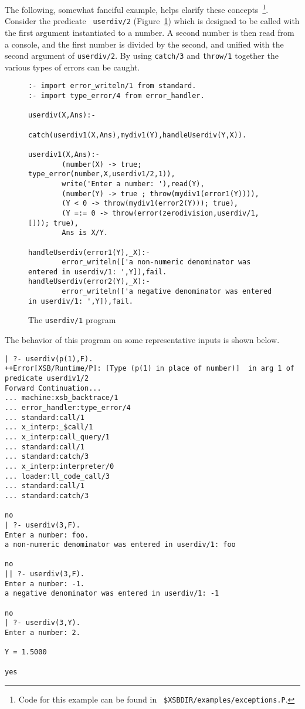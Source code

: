 The following, somewhat fanciful example, helps clarify these
concepts~\footnote{Code for this example can be found in {\tt
\$XSBDIR/examples/exceptions.P}.}.  Consider the predicate {\tt
userdiv/2} (Figure~\ref{fig:userdiv}) which is designed to be called
with the first argument instantiated to a number.  A second number is
then read from a console, and the first number is divided by the
second, and unified with the second argument of {\tt userdiv/2}.  By
using {\tt catch/3} and {\tt throw/1} together the various types of
errors can be caught.

\begin{figure}[hbtp]
\longline
\begin{small}
\begin{verbatim}
:- import error_writeln/1 from standard.
:- import type_error/4 from error_handler.

userdiv(X,Ans):- 
        catch(userdiv1(X,Ans),mydiv1(Y),handleUserdiv(Y,X)).

userdiv1(X,Ans):- 
        (number(X) -> true; type_error(number,X,userdiv1/2,1)),
        write('Enter a number: '),read(Y),
        (number(Y) -> true ; throw(mydiv1(error1(Y)))),
        (Y < 0 -> throw(mydiv1(error2(Y))); true),
        (Y =:= 0 -> throw(error(zerodivision,userdiv/1,[])); true),
        Ans is X/Y.

handleUserdiv(error1(Y),_X):- 
        error_writeln(['a non-numeric denominator was entered in userdiv/1: ',Y]),fail.
handleUserdiv(error2(Y),_X):- 
        error_writeln(['a negative denominator was entered in userdiv/1: ',Y]),fail.
\end{verbatim}
\end{small}
\caption{The {\tt userdiv/1} program} \label{fig:userdiv}
\longline
\end{figure}

The behavior of this program on some representative inputs is shown
below.

\begin{small}
\begin{verbatim}
| ?- userdiv(p(1),F).
++Error[XSB/Runtime/P]: [Type (p(1) in place of number)]  in arg 1 of predicate userdiv1/2
Forward Continuation...
... machine:xsb_backtrace/1
... error_handler:type_error/4
... standard:call/1
... x_interp:_$call/1
... x_interp:call_query/1
... standard:call/1
... standard:catch/3
... x_interp:interpreter/0
... loader:ll_code_call/3
... standard:call/1
... standard:catch/3

no
| ?- userdiv(3,F).
Enter a number: foo.
a non-numeric denominator was entered in userdiv/1: foo

no
|| ?- userdiv(3,F).
Enter a number: -1.
a negative denominator was entered in userdiv/1: -1

no
| ?- userdiv(3,Y).
Enter a number: 2.

Y = 1.5000

yes
\end{verbatim}
\end{small}

